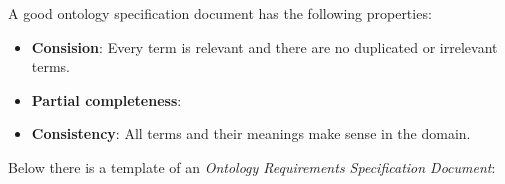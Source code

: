 A good ontology specification document has the following properties:

\begin{itemize}
  \item \textbf{Consision}: Every term is relevant and there are no duplicated or irrelevant terms.
  \item \textbf{Partial completeness}: %
  \item \textbf{Consistency}: All terms and their meanings make sense in the domain.
\end{itemize}

Below there is a template of an \emph{Ontology Requirements Specification Document}\cite{ORSD}:

\vspace{.5cm}

